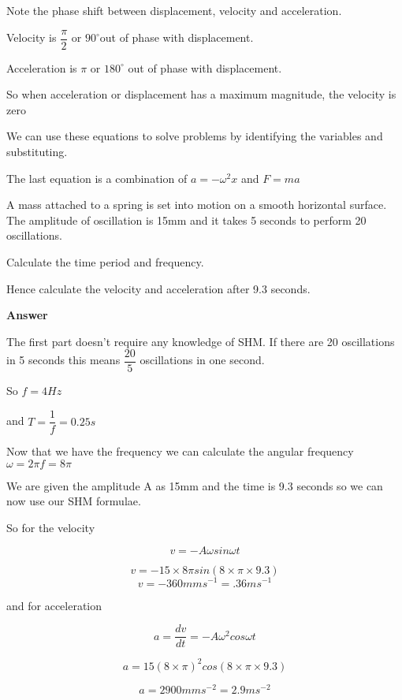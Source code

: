 \documentclass[main.tex]{subfiles}
\begin{document}
Note the phase shift between displacement, velocity and acceleration.

Velocity is $\dfrac{\pi}{2}$ or $90^\circ$out of phase with displacement.

Acceleration is $\pi$ or $180^\circ$ out of phase with displacement.

So when acceleration or displacement has a maximum magnitude, the velocity is zero



We can use these equations to solve problems by identifying the variables and substituting.

The last equation is a combination of $a = -\omega^2 x$ and $F = ma$

\begin{example}


A mass attached to a spring is set into motion on a smooth horizontal surface. The amplitude of oscillation is 15mm and it takes 5 seconds to perform 20 oscillations.

Calculate the time period and frequency.

Hence calculate the velocity and acceleration after 9.3 seconds.

	\vspace{1cm}
    
\textbf{Answer}

The first part doesn't require any knowledge of SHM. If there are 20 oscillations in 5 seconds this means $\dfrac{20}{5}$ oscillations in one second.

So $f=4Hz$

and $T = \dfrac{1}{f} = 0.25s$

Now that we have the frequency we can calculate the angular frequency $\omega = 2 \pi f = 8 \pi$

We are given the amplitude A as 15mm and the time is 9.3 seconds so we can now use our SHM formulae.

So for the velocity

\[
v=-A \omega sin \omega t 
\]

\[
v = -15 \times 8 \pi sin (8 \times \pi \times 9.3)
\]
\[
v = -360 mms^{-1} = .36ms^{-1}
\]

and for acceleration

\[
a = \dfrac{dv}{dt}= -A \omega^2 cos \omega t
\]

\[
a = 15 (8 \times \pi)^2 cos (8 \times \pi \times 9.3)
\]

\[
a = 2900 mms^{-2} = 2.9ms^{-2}
\]


\end{example}
\end{document}
